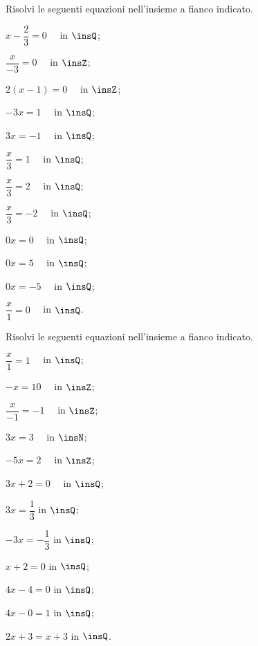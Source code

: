 \begin{esercizio}[\Ast]
\label{ese:15.9}
Risolvi le seguenti equazioni nell'insieme a fianco indicato.
\begin{multicols}{3}
\begin{enumeratea}
 \item $x-\dfrac{2}{3}=0\quad$ in $\insQ$;
 \item $\dfrac{x}{-3}=0\quad$ in $\insZ$;
 \item $2(x-1)=0\quad$ in $\insZ$;
 \item $-3x=1\quad$ in $\insQ$;
 \item $3x=-1\quad$ in $\insQ$;
 \item $\dfrac{x}{3}=1\quad$ in $\insQ$;
 \item $\dfrac{x}{3}=2\quad$ in $\insQ$;
 \item $\dfrac{x}{3}=-2\quad$ in $\insQ$;
 \item $0x=0\quad$ in $\insQ$;
 \item $0x=5\quad$ in $\insQ$;
 \item $0x=-5\quad$ in $\insQ$;
 \item $\dfrac{x}{1}=0\quad$ in $\insQ$.
\end{enumeratea}
\end{multicols}
\end{esercizio}

\begin{esercizio}[\Ast]
\label{ese:15.10}
Risolvi le seguenti equazioni nell'insieme a fianco indicato.
\begin{multicols}{3}
\begin{enumeratea}
 \item $\dfrac{x}{1}=1\quad$ in $\insQ$;
 \item $-x=10\quad$ in $\insZ$;
 \item $\dfrac{x}{-1}=-1\quad$ in $\insZ$;
 \item $3x=3\quad$ in $\insN$;
 \item $-5x=2\quad$ in $\insZ$;
 \item $3x+2=0\quad$ in $\insQ$;
 \item $3x=\dfrac{1}{3}$ in $\insQ$;
 \item $-3x=-{\dfrac{1}{3}}$ in $\insQ$;
 \item $x+2=0$ in $\insQ$;
 \item $4x-4=0$ in $\insQ$;
 \item $4x-0=1$ in $\insQ$;
 \item $2x+3=x+3$ in $\insQ$.
\end{enumeratea}
\end{multicols}
\end{esercizio}

